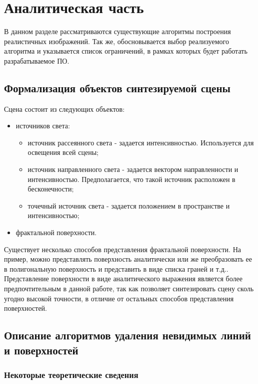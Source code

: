 \chapter{Аналитическая часть}

В данном разделе рассматриваются существующие алгоритмы построения реалистичных изображений. Так же, обосновывается выбор реализуемого алгоритма и указывается список ограничений, в рамках которых будет работать разрабатываемое ПО.

\section{Формализация объектов синтезируемой сцены}
Сцена состоит из следующих объектов:
\begin{itemize}
    \item источников света:
    \begin{itemize}
        \item источник рассеянного света - задается интенсивностью. Используется для освещения всей сцены;
        \item источник направленного света - задается вектором направленности и интенсивностью. Предполагается, что такой источник расположен в бесконечности;
        \item точечный источник света - задается положением в пространстве и интенсивностью;
    \end{itemize}   
    \item фрактальной поверхности.
\end{itemize}

Существует несколько способов представления фрактальной поверхности. На пример, можно представлять поверхность аналитически или же преобразовать ее в полигональную поверхность и представить в виде списка граней и т.д.. Представление поверхности в виде аналитического выражения является более предпочтительным в данной работе, так как позволяет синтезировать сцену сколь угодно высокой точности, в отличие от остальных способов представления поверхностей.

\section{Описание алгоритмов удаления невидимых линий и поверхностей}

\subsection {Некоторые теоретические сведения}

